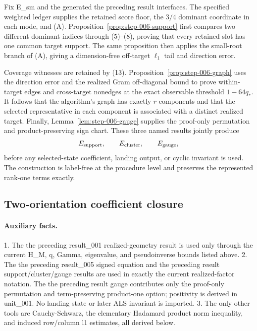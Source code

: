 Fix E\_sm and the generated the preceding result interfaces. The specified weighted ledger
supplies the retained score floor, the \(3/4\) dominant coordinate in each
mode, and (A). Proposition~\ref{prop:step-006-support} first compares two
different dominant indices through (5)--(8), proving that every retained
slot has one common target support. The same proposition then applies the
small-root branch of (A), giving a dimension-free off-target \(\ell_1\) tail
and direction error.

Coverage witnesses are retained by (13). Proposition~\ref{prop:step-006-graph}
uses the direction error and the realized Gram off-diagonal bound to prove
within-target edges and cross-target nonedges at the exact observable
threshold \(1-64q_*\). It follows that the algorithm's graph has exactly
\(r\) components and that the selected representative in each component is
associated with a distinct realized target. Finally,
Lemma~\ref{lem:step-006-gauge} supplies the proof-only permutation and
product-preserving sign chart. These three named results jointly produce
\[
 E_{\rm support},\qquad E_{\rm cluster},\qquad E_{\rm gauge},
\]
before any selected-state coefficient, landing output, or cyclic invariant is
used. The construction is label-free at the procedure level and preserves
the represented rank-one terms exactly.

\subsection{Two-orientation coefficient closure}\label{app:step-007}

\paragraph{Auxiliary facts.}

1. The the preceding result\_001 realized-geometry result is used only through the
   current H\_M, q, Gamma, eigenvalue, and pseudoinverse bounds listed above.
2. The the preceding result\_005 signed equation and the preceding result support/cluster/gauge
   results are used in exactly the current realized-factor notation.  The
   the preceding result gauge contributes only the proof-only permutation and
   term-preserving product-one option; positivity is derived in unit\_001.
   No landing state or later ALS invariant is imported.
3. The only other tools are Cauchy-Schwarz, the elementary Hadamard product
   norm inequality, and induced row/column l1 estimates, all derived below.

